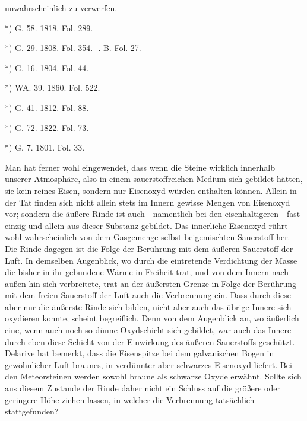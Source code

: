 \documentclass[a4paper, 11pt, oneside, polutonikogreek, german]{article}
\begin{document}
unwahrscheinlich zu verwerfen.

*) G. 58. 1818. Fol. 289.

*) G. 29. 1808. Fol. 354. -. B. Fol. 27.

*) G. 16. 1804. Fol. 44.

*) WA. 39. 1860. Fol. 522.

*) G. 41. 1812. Fol. 88.

*) G. 72. 1822. Fol. 73.

*) G. 7. 1801. Fol. 33.

Man hat ferner wohl eingewendet, dass wenn die Steine wirklich innerhalb unserer Atmosphäre, also in einem sauerstoffreichen Medium sich gebildet hätten, sie kein reines Eisen, sondern nur Eisenoxyd würden enthalten können. Allein in der Tat finden sich nicht allein stets im Innern gewisse Mengen von Eisenoxyd vor; sondern die äußere Rinde ist auch - namentlich bei den eisenhaltigeren - fast einzig und allein aus dieser Substanz gebildet. Das innerliche Eisenoxyd rührt wohl wahrscheinlich von dem Gasgemenge selbst beigemischten Sauerstoff her. Die Rinde dagegen ist die Folge der Berührung mit dem äußeren Sauerstoff der Luft. In demselben Augenblick, wo durch die eintretende Verdichtung der Masse die bisher in ihr gebundene Wärme in Freiheit trat, und von dem Innern nach außen hin sich verbreitete, trat an der äußersten Grenze in Folge der Berührung mit dem freien Sauerstoff der Luft auch die Verbrennung ein. Dass durch diese aber nur die äußerste Rinde sich bilden, nicht aber auch das übrige Innere sich oxydieren konnte, scheint begreiflich. Denn von dem Augenblick an, wo äußerlich eine, wenn auch noch so dünne Oxydschicht sich gebildet, war auch das Innere durch eben diese Schicht von der Einwirkung des äußeren Sauerstoffs geschützt. Delarive hat bemerkt, dass die Eisenspitze bei dem galvanischen Bogen in gewöhnlicher Luft braunes, in verdünnter aber schwarzes Eisenoxyd liefert. Bei den Meteorsteinen werden sowohl braune als schwarze Oxyde erwähnt. Sollte sich aus diesem Zustande der Rinde daher nicht ein Schluss auf die größere oder geringere Höhe ziehen lassen, in welcher die Verbrennung tatsächlich stattgefunden?
\end{document}
